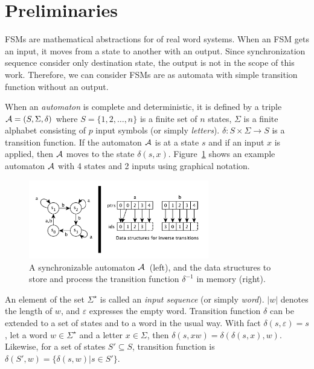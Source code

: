 \documentclass[12pt]{article}
\begin{document}
\clearpage
\section{Preliminaries}
\label{sec:Preliminaries}
FSMs are mathematical abstractions for of real word systems. When an FSM gets an input, it moves from a state to another with an output. Since synchronization sequence consider only destination state, the output is not in the scope of this work. Therefore, we can consider FSMs are as automata with simple transition function without an output.

When an {\em automaton} is complete and deterministic, it is defined by a triple ${\cal A}=(S, \Sigma, \delta)$  where $S = \{1, 2, \ldots, n\}$ is a finite set of $n$ states, $\Sigma$ is a finite alphabet consisting of $p$ input symbols (or simply {\em letters}). $\delta : S \times \Sigma \rightarrow S$ is a transition function. If the automaton ${\cal A}$ is at a state $s$ and if an input $x$ is applied, then ${\cal A}$ moves to the state $\delta(s,x)$. Figure~\ref{fig:inv} shows an example automaton ${\cal A}$ with 4 states and 2 inputs using graphical notation.

\begin{figure}[ht]
\centering
\includegraphics[width=0.7\textwidth]{figs/inverse.pdf}
\caption{A synchronizable automaton ${\cal A}$~(left), and the data structures to store and process the transition function $\delta^{-1}$  in memory (right).}
\label{fig:inv}
\vspace*{-3ex}
\end{figure}

An element of the set $\Sigma^\star$ is called an {\em input sequence} (or simply {\em word}). $|w|$ denotes the length of $w$, and $\varepsilon$ expresses the empty word. Transition function $\delta$ can be extended to a set of states and to a word in the usual way. With fact $\delta(s,\varepsilon)=s$, let a word $w \in \Sigma^\star$ and a letter $x \in \Sigma$, then $\delta(s,xw) = \delta(\delta(s,x),w)$. Likewise, for a set of states $S' \subseteq S$, transition function is $\delta(S',w) = \{ \delta(s,w) | s \in S'\}$.
\end{document}
